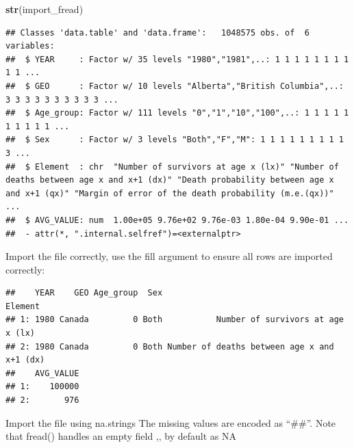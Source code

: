 \documentclass[]{book}
\newenvironment{Shaded}{\begin{snugshade}}{\end{snugshade}}
\newcommand{\DataTypeTok}[1]{\textcolor[rgb]{0.13,0.29,0.53}{#1}}
\newcommand{\DecValTok}[1]{\textcolor[rgb]{0.00,0.00,0.81}{#1}}
\newcommand{\KeywordTok}[1]{\textcolor[rgb]{0.13,0.29,0.53}{\textbf{#1}}}
\newcommand{\NormalTok}[1]{#1}
\newcommand{\OperatorTok}[1]{\textcolor[rgb]{0.81,0.36,0.00}{\textbf{#1}}}
\newcommand{\OtherTok}[1]{\textcolor[rgb]{0.56,0.35,0.01}{#1}}
\newcommand{\StringTok}[1]{\textcolor[rgb]{0.31,0.60,0.02}{#1}}
\begin{document}
\begin{Shaded}
\begin{Highlighting}[]
\KeywordTok{str}\NormalTok{(import_fread)}
\end{Highlighting}
\end{Shaded}

\begin{verbatim}
## Classes 'data.table' and 'data.frame':	1048575 obs. of  6 variables:
##  $ YEAR     : Factor w/ 35 levels "1980","1981",..: 1 1 1 1 1 1 1 1 1 1 ...
##  $ GEO      : Factor w/ 10 levels "Alberta","British Columbia",..: 3 3 3 3 3 3 3 3 3 3 ...
##  $ Age_group: Factor w/ 111 levels "0","1","10","100",..: 1 1 1 1 1 1 1 1 1 1 ...
##  $ Sex      : Factor w/ 3 levels "Both","F","M": 1 1 1 1 1 1 1 1 1 3 ...
##  $ Element  : chr  "Number of survivors at age x (lx)" "Number of deaths between age x and x+1 (dx)" "Death probability between age x and x+1 (qx)" "Margin of error of the death probability (m.e.(qx))" ...
##  $ AVG_VALUE: num  1.00e+05 9.76e+02 9.76e-03 1.80e-04 9.90e-01 ...
##  - attr(*, ".internal.selfref")=<externalptr>
\end{verbatim}

Import the file correctly, use the fill argument to ensure all rows are imported correctly:

\begin{Shaded}
\end{Shaded}

\begin{verbatim}
##    YEAR    GEO Age_group  Sex                                     Element
## 1: 1980 Canada         0 Both           Number of survivors at age x (lx)
## 2: 1980 Canada         0 Both Number of deaths between age x and x+1 (dx)
##    AVG_VALUE
## 1:    100000
## 2:       976
\end{verbatim}

Import the file using na.strings
The missing values are encoded as ``\#\#''. Note that fread() handles an empty field ,, by default as NA

\begin{Shaded}
\end{Shaded}
\end{document}

